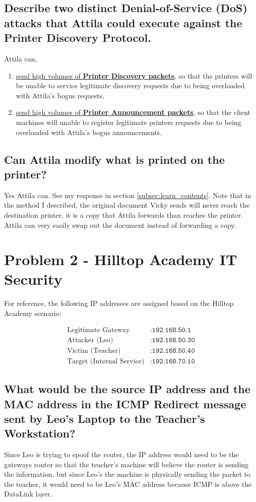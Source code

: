 \documentclass{article}
\begin{document}
\subsection{Describe two distinct Denial-of-Service (DoS) attacks that Attila could execute
against the Printer Discovery Protocol.}
	Attila can,
	\begin{enumerate}
		\item \underline{send high volumes of \textbf{Printer Discovery packets}}, so that the printers will be unable to service legitimate
		discovery requests due to being overloaded with Attila's bogus requests.
		\item \underline{send high volumes of \textbf{Printer Announcement packets}}, so that the client machines will unable to register legitimate 
		printers requests due to being overloaded with Attila's bogus announcements.
	\end{enumerate}

\subsection{Can Attila modify what is printed on the printer?}
	Yes Attila can. See my response in section \ref{subsec:learn_contents}. Note that in the method I described, the 
	original document Vicky sends will never reach the destination printer, it is a copy that Attila forwards than reaches the printer.
	Attila can very easily swap out the document instead of forwarding a copy.

\section{Problem 2 - Hilltop Academy IT Security}
\label{sec:hilltop}

For reference, the following IP addresses are assigned based on the Hilltop Academy scenario:

\begin{align*}
    \text{Legitimate Gateway} &: \texttt{192.168.50.1} \\
    \text{Attacker (Leo)} &: \texttt{192.168.50.30} \\
    \text{Victim (Teacher)} &: \texttt{192.168.50.40} \\
    \text{Target (Internal Service)} &: \texttt{192.168.70.10}
\end{align*}

\subsection{What would be the source IP address and the MAC address in the ICMP
Redirect message sent by Leo’s Laptop to the Teacher’s Workstation?}
	Since Leo is trying to spoof the router, the IP address would need to be the gateways router so that the teacher's
	machine will believe the router is sending the information, but since Leo's the machine is physically 
	sending the packet to the teacher, it would need to be Leo's MAC address because ICMP is above the DataLink layer.
\end{document}
